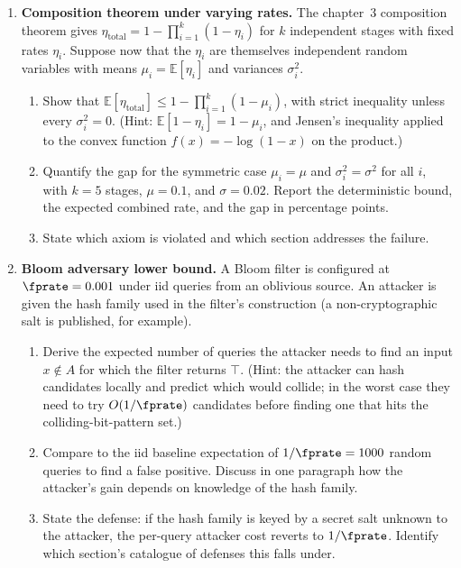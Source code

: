\begin{enumerate}
\item \exstarstar
\label{ex:ch16-5}
\textbf{Composition theorem under varying rates.}
The chapter~3 composition theorem  gives
$\eta_{\text{total}} = 1 - \prod_{i = 1}^{k} (1 - \eta_i)$ for $k$
independent stages with fixed rates $\eta_i$. Suppose now that the
$\eta_i$ are themselves independent random variables with means
$\mu_i = \mathbb{E}[\eta_i]$ and variances $\sigma_i^2$.
\begin{enumerate}
  \item[(a)] Show that $\mathbb{E}[\eta_{\text{total}}] \le 1 -
    \prod_{i = 1}^{k} (1 - \mu_i)$, with strict inequality unless
    every $\sigma_i^2 = 0$. (Hint: $\mathbb{E}[1 - \eta_i] =
    1 - \mu_i$, and Jensen's inequality applied to the convex
    function $f(x) = -\log(1 - x)$ on the product.)
  \item[(b)] Quantify the gap for the symmetric case $\mu_i = \mu$
    and $\sigma_i^2 = \sigma^2$ for all $i$, with $k = 5$ stages,
    $\mu = 0.1$, and $\sigma = 0.02$. Report the deterministic
    bound, the expected combined rate, and the gap in percentage
    points.
  \item[(c)] State which axiom is violated and which section
    addresses the failure.
\end{enumerate}

\item \exstarstar
\label{ex:ch16-6}
\textbf{Bloom adversary lower bound.}
A Bloom filter is configured at $\fprate = 0.001$ under iid
queries from an oblivious source. An attacker is given the hash
family used in the filter's construction (a non-cryptographic
salt is published, for example).
\begin{enumerate}
  \item[(a)] Derive the expected number of queries the attacker
    needs to find an input $x \notin A$ for which the filter
    returns $\top$. (Hint: the attacker can hash candidates
    locally and predict which would collide; in the worst case
    they need to try $O(1 / \fprate)$ candidates before finding
    one that hits the colliding-bit-pattern set.)
  \item[(b)] Compare to the iid baseline expectation of $1 /
    \fprate = 1000$ random queries to find a false positive.
    Discuss in one paragraph how the attacker's gain depends on
    knowledge of the hash family.
  \item[(c)] State the defense: if the hash family is keyed by a
    secret salt unknown to the attacker, the per-query attacker
    cost reverts to $1 / \fprate$. Identify which section's
    catalogue of defenses this falls under.
\end{enumerate}


\end{enumerate}
